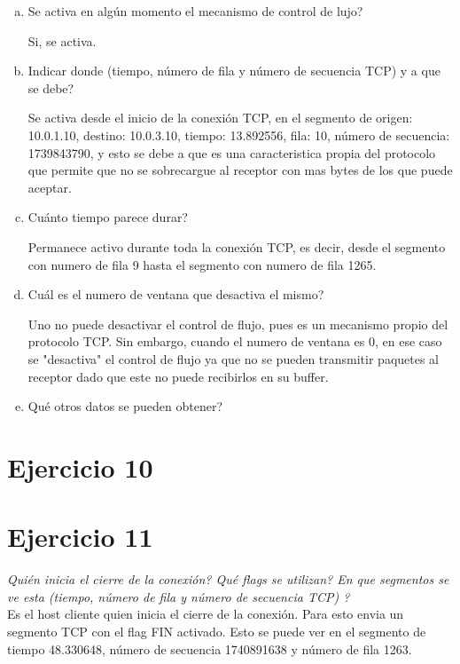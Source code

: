 \documentclass[osajnl,twocolumn,showpacs,superscriptaddress,10pt]{revtex4-1} %
\begin{document}
\begin{enumerate}[a)]
    \item Se activa en algún momento el mecanismo de control de lujo?

    Si, se activa. 
   
    \item Indicar donde (tiempo, número de fila y número de secuencia TCP) y a que se debe?

    Se activa desde el inicio de la conexión TCP, en el segmento de origen: 10.0.1.10, destino: 10.0.3.10, tiempo: 13.892556, fila: 10, número de secuencia: 1739843790, y esto
    se debe a que es una caracteristica propia del protocolo que permite que no se sobrecargue al receptor con mas bytes de los que puede aceptar.    

    \item Cuánto tiempo parece durar?

    Permanece activo durante toda la conexión TCP, es decir, desde el segmento con numero de fila 9 hasta el segmento
    con numero de fila 1265.

    \item Cuál es el numero de ventana que desactiva el mismo?

    Uno no puede desactivar el control de flujo, pues es un mecanismo propio del protocolo TCP. Sin embargo, cuando el numero de ventana es 0, en ese caso se "desactiva" 
    el control de flujo ya que no se pueden transmitir paquetes al receptor dado que este no puede recibirlos en su buffer.

    \item Qué otros datos se pueden obtener?
\end{enumerate}

\section{Ejercicio 10}

\section{Ejercicio 11}

\textit{Quién inicia el cierre de la conexión? Qué flags se utilizan? En que segmentos se ve esta (tiempo, número de fila y número de secuencia TCP) ?} \\

Es el host cliente quien inicia el cierre de la conexión. Para esto envia un segmento TCP con el flag FIN activado. Esto se puede ver en el 
segmento de tiempo 48.330648, número de secuencia 1740891638 y número de fila 1263. \\
\end{document}
